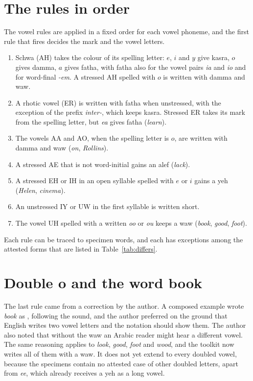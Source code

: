 \begin{table}[ht]\centering\small

\caption{Attested forms that differ from the computed forms in their letters.}\label{tab:differs}
\end{table}

\section{The rules in order}
The vowel rules are applied in a fixed order for each vowel phoneme, and the first rule that fires decides the mark and the vowel letters.
\begin{enumerate}
\item Schwa (AH) takes the colour of its spelling letter: $e$, $i$ and $y$ give kasra, $o$ gives damma, $a$ gives fatha, with fatha also for the vowel pairs \emph{ia} and \emph{io} and for word-final \emph{-em}. A stressed AH spelled with $o$ is written with damma and waw.
\item A rhotic vowel (ER) is written with fatha when unstressed, with the exception of the prefix \emph{inter-}, which keeps kasra. Stressed ER takes its mark from the spelling letter, but \emph{ea} gives fatha (\emph{learn}).
\item The vowels AA and AO, when the spelling letter is $o$, are written with damma and waw (\emph{on}, \emph{Rollins}).
\item A stressed AE that is not word-initial gains an alef (\emph{lack}).
\item A stressed EH or IH in an open syllable spelled with $e$ or $i$ gains a yeh (\emph{Helen}, \emph{cinema}).
\item An unstressed IY or UW in the first syllable is written short.
\item The vowel UH spelled with a written \emph{oo} or \emph{ou} keeps a waw (\emph{book}, \emph{good}, \emph{foot}).
\end{enumerate}
Each rule can be traced to specimen words, and each has exceptions among the attested forms that are listed in Table~\ref{tab:differs}.

\section{Double o and the word book}
The last rule came from a correction by the author. A composed example wrote \emph{book} as , following the sound, and the author preferred  on the ground that English writes two vowel letters and the notation should show them. The author also noted that without the waw an Arabic reader might hear a different vowel. The same reasoning applies to \emph{look}, \emph{good}, \emph{foot} and \emph{wood}, and the toolkit now writes all of them with a waw. It does not yet extend to every doubled vowel, because the specimens contain no attested case of other doubled letters, apart from \emph{ee}, which already receives a yeh as a long vowel.

